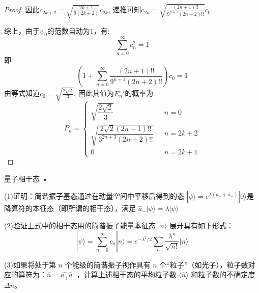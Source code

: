 \begin{proof}
因此$c_{2k+2}=\sqrt{\frac{2k+1}{9(2k+2)}}c_{2k}$, 递推可知$c_{2n}=\sqrt{\frac{(2n+1)!!}{9^{n+1}(2n+2)!!}}c_0$. 

综上，由于$\psi_0$的范数自动为$1$，有:
\[
    \sum_{n=0}^\infty c_n^2=1
\]
即
\[
    \left(1+\sum_{n=0}^\infty\frac{(2n+1)!!}{9^{n+1}(2n+2)!!}\right)c_0=1
\]
由等式知道$c_0=\sqrt{\frac{2\sqrt{2}}{3}}$, 因此其值为$E_n'$的概率为
\[
    P_n=\left\{
        \begin{array}{ll} 
            \sqrt{\dfrac{2\sqrt{2}}{3}}     \ \ \  &n=0 \\
            \sqrt{\dfrac{2\sqrt{2}(2n+1)!!}{3^{2n+3}(2n+2)!!}}\ \ \  &n=2k+2 \\
            0 &n=2k+1
        \end{array}
    \right.
\]
\end{proof}
\begin{6}
    量子相干态 •

(1)证明：简谐振子基态通过在动量空间中平移后得到的态 $|\psi\rangle=e^{\lambda\left(a_{+}+\hat{a}_{-}\right)}|0\rangle$是降算符的本征态（即所谓的相干态），满足 $\hat{a}_{-}|\psi\rangle=\lambda|\psi\rangle$ 

(2)验证上式中的相干态用的简谐振子能量本征态 $|n\rangle$ 展开具有如下形式：
$$
|\psi\rangle=\sum_{n=0}^{\infty} c_{n}|n\rangle=e^{-\lambda^{2} / 2} \sum_{n} \frac{\lambda^{n}}{\sqrt{n!}}|n\rangle
$$

(3)如果将处于第 $n$ 个能级的简谐振子视作具有 $n$ 个``粒子''（如光子），粒子数对应的算符为：$\hat{n}=\hat{a_{+}} \hat{a}_{-}$，计算上述相干态的平均粒子数 $\langle\hat{n}\rangle$ 和粒子数的不确定度 $\Delta n$。
\end{6}
